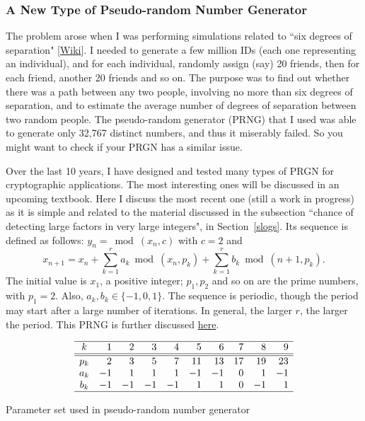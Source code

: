 \documentclass[10pt]{article}
\begin{document}
\subsubsection{A New Type of Pseudo-random Number Generator}\label{prng0988}

The problem arose when I was performing simulations related to ``six degrees of separation" [\href{https://en.wikipedia.org/wiki/Six_degrees_of_separation}{Wiki}].
I needed to generate a few million IDs (each one representing an individual), and for each individual, randomly assign (say) 20 friends, then for each friend, another 20 friends and so on.
The purpose was to find out whether there was a path between any two people, involving no more than six degrees of separation, and to estimate the average number of degrees of separation between two random people. The pseudo-random generator (PRNG) that I used was able to generate only 32,767 distinct numbers, and thus it miserably failed. So you might want to check if your PRGN has a similar issue.

Over the last 10 years, I have designed and tested many types of PRGN for cryptographic applications. The most interesting ones will be discussed in an upcoming textbook. Here I discuss the most recent one (still a work in progress) as it is simple and related to the material discussed in the subsection ``chance of detecting large factors in very large integers", in Section~\ref{slogs}. Its sequence is defined as follows: $y_n=\bmod(x_n,c)$ with $c=2$ and
$$x_{n+1} = x_n +\sum_{k=1}^r a_k\bmod(x_n,p_k)+\sum_{k=1}^r b_k\bmod(n+1,p_k).$$
The initial value is $x_1$, a positive integer; $p_1,p_2$ and so on are the prime numbers, with $p_1=2$. Also, $a_k,b_k\in \{-1, 0, 1\}$. The sequence is periodic, though the period may start after a large number of iterations. In general, the larger $r$, the larger the period. This PRNG is further discussed \href{https://math.stackexchange.com/questions/4308185/period-or-lack-of-for-a-probably-new-pseudo-random-number-generator}{here}.

\begin{table}%
\[
\begin{array}{crrrrrrrrr}
\hline
k & 1& 2 & 3 & 4 & 5 & 6 & 7 & 8 & 9\\ \hline
\hline
p_k & 2& 3 & 5 & 7 & 11 & 13 & 17 & 19 & 23\\
a_k& -1 & 1 & 1 & 1 & -1 & -1 & 0 & 1 & -1 \\
b_k&  -1 & -1 & -1 & -1& 1&  1 & 0 & -1 & 1\\
\hline
\end{array}
\]
\caption{\label{tabprng}Parameter set used in pseudo-random number generator}
\end{table}
\end{document}
